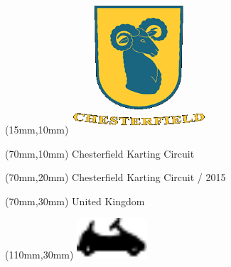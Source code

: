 \null\newpage
\begin{textblock*}{50mm}(15mm,10mm)%
\includegraphics[width=50mm]{LG/CHE.png}
\end{textblock*}
\begin{textblock*}{130mm}(70mm,10mm)%
{\fontsize{20}{20}\selectfont Chesterfield Karting Circuit}\\
\end{textblock*}
\begin{textblock*}{120mm}(70mm,20mm)%
{\fontsize{16}{16}\selectfont Chesterfield Karting Circuit / 2015}\\
\end{textblock*}
\begin{textblock*}{120mm}(70mm,30mm)%
{\fontsize{12}{12}\selectfont United Kingdom}
\end{textblock*}
\begin{textblock*}{30mm}(110mm,30mm)%
\centering
\includegraphics[height=15mm]{icons/kart.pdf}
\end{textblock*}
